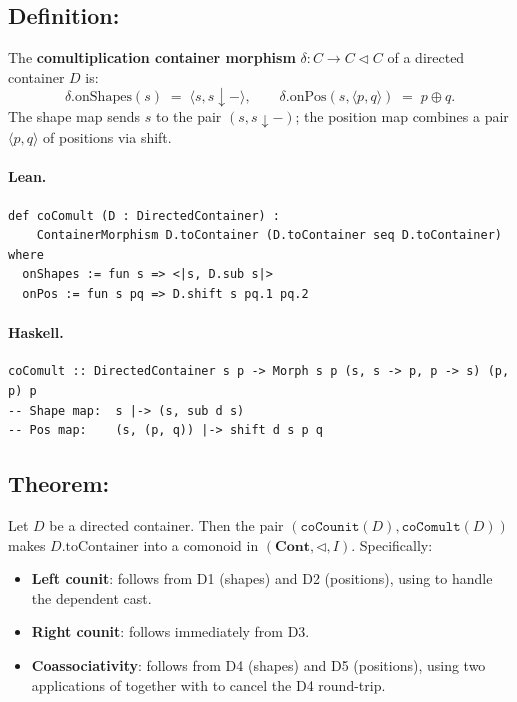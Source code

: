 \documentclass[11pt,a4paper]{article}
\begin{document}
\subsection{Definition: }

\begin{defn}
The \textbf{comultiplication container morphism} $\delta : C \to C \triangleleft C$
of a directed container $D$ is:
\[
  \delta.\mathrm{onShapes}(s) \;=\; \langle s, s \mathop{\downarrow} - \rangle, \qquad
  \delta.\mathrm{onPos}(s, \langle p, q \rangle) \;=\; p \oplus q.
\]
The shape map sends $s$ to the pair $(s, s \downarrow -)$; the position map
combines a pair $\langle p, q \rangle$ of positions via shift.
\end{defn}

\paragraph{Lean.}
\begin{lstlisting}[style=lean]
def coComult (D : DirectedContainer) :
    ContainerMorphism D.toContainer (D.toContainer seq D.toContainer) where
  onShapes := fun s => <|s, D.sub s|>
  onPos := fun s pq => D.shift s pq.1 pq.2
\end{lstlisting}

\paragraph{Haskell.}
\begin{lstlisting}[style=haskell]
coComult :: DirectedContainer s p -> Morph s p (s, s -> p, p -> s) (p, p) p
-- Shape map:  s |-> (s, sub d s)
-- Pos map:    (s, (p, q)) |-> shift d s p q
\end{lstlisting}


\subsection{Theorem: }

\begin{thm}
Let $D$ be a directed container.  Then the pair
$(\mathtt{coCounit}(D), \mathtt{coComult}(D))$ makes $D.\mathrm{toContainer}$
into a comonoid in $(\mathbf{Cont}, \triangleleft, I)$.  Specifically:
\begin{itemize}
  \item \textbf{Left counit}: follows from D1 (shapes) and D2 (positions), using
     to handle the dependent cast.
  \item \textbf{Right counit}: follows immediately from D3.
  \item \textbf{Coassociativity}: follows from D4 (shapes) and D5 (positions),
    using two applications of  together with
     to cancel the D4 round-trip.
\end{itemize}
\end{thm}
\end{document}
